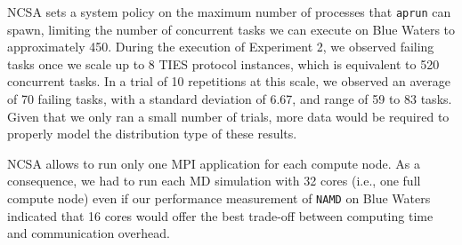 NCSA sets a system policy on the maximum number of processes that
\texttt{aprun} can spawn, limiting the number of concurrent tasks we can
execute on Blue Waters to approximately 450. During the execution of
Experiment 2, we observed failing tasks once we scale up to 8 TIES protocol
instances, which is equivalent to 520 concurrent tasks. In a trial of 10
repetitions at this scale, we observed an average of 70 failing tasks, with a
standard deviation of 6.67, and range of 59 to 83 tasks. Given that we only
ran a small number of trials, more data would be required to properly model
the distribution type of these results.

NCSA allows to run only one MPI application for each compute node. As a
consequence, we had to run each MD simulation with 32 cores (i.e., one full
compute node) even if our performance measurement of \texttt{NAMD} on Blue
Waters indicated that 16 cores would offer the best trade-off between
computing time and communication overhead.







